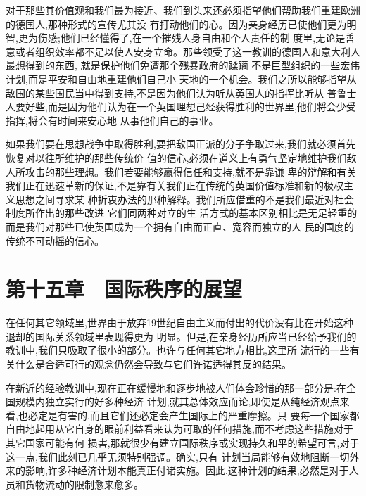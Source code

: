 ﻿\documentclass[12pt]{article}
\begin{document}
对于那些其价值观和我们最为接近、我们到头来还必须指望他们帮助我们重建欧洲的德国人,那种形式的宣传尤其没
有打动他们的心。因为亲身经历已使他们更为明智,更为伤感;他们已经懂得了,在一个摧残人身自由和个人责任的制
度里,无论是善意或者组织效率都不足以使人安身立命。那些领受了这一教训的德国人和意大利人最想得到的东西,
就是保护他们免遭那个残暴政府的蹂躏 \myrule 不是巨型组织的一些宏伟计划,而是平安和自由地重建他们自己小
天地的一个机会。我们之所以能够指望从敌国的某些国民当中得到支持,不是因为他们认为听从英国人的指挥比听从
普鲁士人要好些,而是因为他们认为在一个英国理想己经获得胜利的世界里,他们将会少受指挥,将会有时间来安心地
从事他们自己的事业。

如果我们要在思想战争中取得胜利,要把敌国正派的分子争取过来,我们就必须首先恢复对以往所维护的那些传统价
值的信心,必须在道义上有勇气坚定地维护我们敌人所攻击的那些理想。我们若要能够赢得信任和支持,就不是靠谦
卑的辩解和有关我们正在迅速革新的保证,不是靠有关我们正在传统的英国价值标准和新的极权主义思想之间寻求某
种折衷办法的那种解释。我们所应借重的不是我们最近对社会制度所作出的那些改进 \myrule 它们同两种对立的生
活方式的基本区别相比是无足轻重的 \myrule 而是我们对那些已使英国成为一个拥有自由而正直、宽容而独立的人
民的国度的传统不可动摇的信心。



\section{第十五章　国际秩序的展望}


在任何其它领域里,世界由于放弃19世纪自由主义而付出的代价没有比在开始这种退却的国际关系领域里表现得更为
明显。但是,在亲身经历所应当已经给予我们的教训中,我们只吸取了很小的部分。也许与任何其它地方相比,这里所
流行的一些有关什么是合适可行的观念仍然会导致与它们许诺适得其反的结果。

在新近的经验教训中,现在正在缓慢地和逐步地被人们体会珍惜的那一部分是:在全国规模内独立实行的好多种经济
计划,就其总体效应而论,即使是从纯经济观点来看,也必定是有害的,而且它们还必定会产生国际上的严重摩擦。只
要每一个国家都自由地起用从它自身的眼前利益看来认为可取的任何措施,而不考虑这些措施对于其它国家可能有何
损害,那就很少有建立国际秩序或实现持久和平的希望可言,对于这一点,我们此刻已几乎无须特别强调。确实,只有
计划当局能够有效地阻断一切外来的影响,许多种经济计划本能真正付诸实施。因此,这种计划的结果,必然是对于人
员和货物流动的限制愈来愈多。
\end{document}
